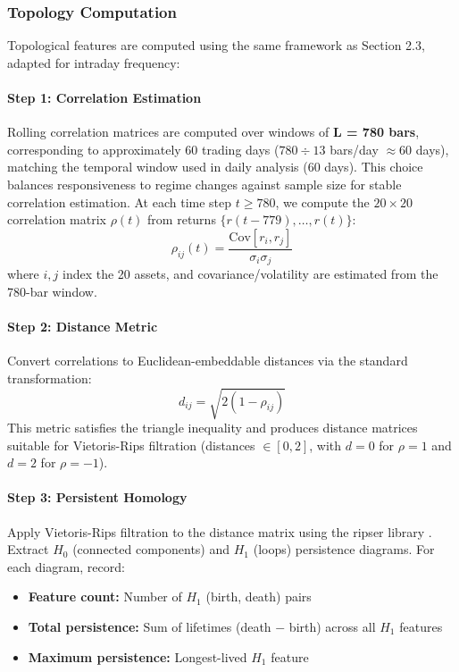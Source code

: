 \subsubsection{Topology Computation}

Topological features are computed using the same framework as Section 2.3, adapted for intraday frequency:

\paragraph{Step 1: Correlation Estimation}
Rolling correlation matrices are computed over windows of \textbf{L = 780 bars}, corresponding to approximately 60 trading days ($780 \div 13$ bars/day $\approx 60$ days), matching the temporal window used in daily analysis (60 days). This choice balances responsiveness to regime changes against sample size for stable correlation estimation. At each time step $t \geq 780$, we compute the $20\times 20$ correlation matrix $\rho(t)$ from returns $\{r(t-779), \ldots, r(t)\}$:
\begin{equation}
\rho_{ij}(t) = \frac{\text{Cov}[r_i, r_j]}{\sigma_i \sigma_j}
\end{equation}
where $i, j$ index the 20 assets, and covariance/volatility are estimated from the 780-bar window.

\paragraph{Step 2: Distance Metric}
Convert correlations to Euclidean-embeddable distances via the standard transformation:
\begin{equation}
d_{ij} = \sqrt{2(1 - \rho_{ij})}
\end{equation}
This metric satisfies the triangle inequality and produces distance matrices suitable for Vietoris-Rips filtration (distances $\in [0, 2]$, with $d = 0$ for $\rho = 1$ and $d = 2$ for $\rho = -1$).

\paragraph{Step 3: Persistent Homology}
Apply Vietoris-Rips filtration to the distance matrix using the ripser library \citep{Tralie2018}. Extract $H_0$ (connected components) and $H_1$ (loops) persistence diagrams. For each diagram, record:
\begin{itemize}
\item \textbf{Feature count:} Number of $H_1$ (birth, death) pairs
\item \textbf{Total persistence:} Sum of lifetimes (death $-$ birth) across all $H_1$ features
\item \textbf{Maximum persistence:} Longest-lived $H_1$ feature
\end{itemize}

